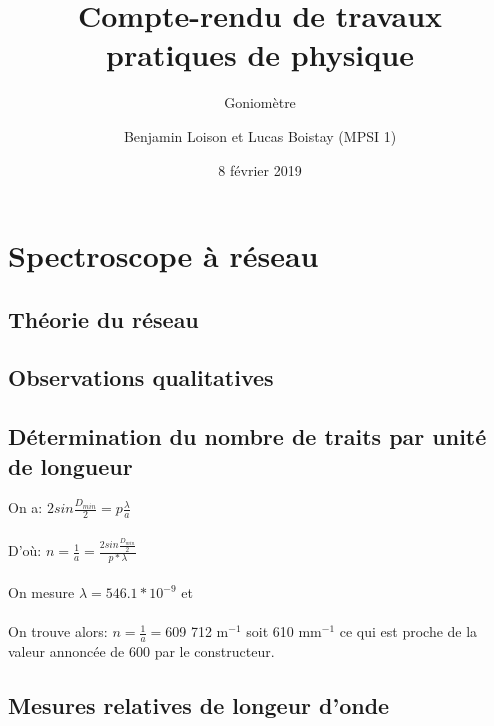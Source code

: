 \documentclass{scrartcl}
\begin{document}
	\title{Compte-rendu de travaux pratiques de physique}
	\subtitle{Goniomètre}
	\author{Benjamin Loison et Lucas Boistay (MPSI 1)}
	\date{8 février 2019}
	\maketitle

  \setcounter{section}{1}
	\section{Spectroscope à réseau}

		\subsection{Théorie du réseau}

			

		\subsection{Observations qualitatives}

		  
			
		\subsection{Détermination du nombre de traits par unité de longueur}
		
		  On a: $2sin\frac{D_{min}}{2}=p\frac{\lambda}{a}$\\\\
			D'où: $n=\frac{1}{a}=\frac{2sin\frac{D_{min}}{2}}{p*\lambda}$\\\\
			On mesure $\lambda = 546.1 * 10^{-9}$ et \\\\
			On trouve alors: $n = \frac{1}{a} = $609 712 m$^{-1}$ soit 610 mm$^{-1}$ ce qui est proche de la valeur annoncée de 600 par le constructeur.

		\subsection{Mesures relatives de longeur d'onde}
			
			
			
\end{document}
